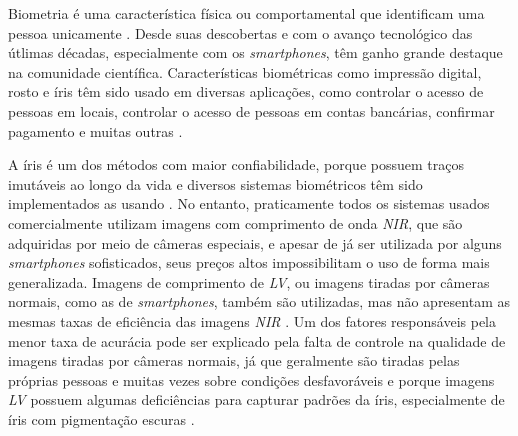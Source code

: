 
\par Biometria é uma característica física ou comportamental que identificam uma pessoa unicamente \cite{wayman2005biometric}. Desde suas descobertas e com o avanço tecnológico das útlimas décadas, especialmente com os \textit{smartphones}, têm ganho grande destaque na comunidade científica. Características biométricas como impressão digital, rosto e íris têm sido usado em diversas aplicações, como controlar o acesso de pessoas em locais, controlar o acesso de pessoas em contas bancárias, confirmar pagamento e muitas outras \cite{li2009encyclopedia, wayman2005biometric}.

\par A íris é um dos métodos com maior confiabilidade, porque possuem traços imutáveis ao longo da
vida e diversos sistemas biométricos têm sido implementados as usando \cite{daugman2004, wayman2005biometric, iris_segmentada,othman2015}. No entanto, praticamente todos os sistemas usados comercialmente utilizam imagens com comprimento de onda \textit{\acrfull{NIR}}, que são adquiridas por meio de câmeras
especiais, e apesar de já ser utilizada por alguns \textit{smartphones} sofisticados, seus preços altos impossibilitam o uso de forma mais generalizada. Imagens de comprimento de \textit{\acrfull{LV}}, ou imagens tiradas por câmeras normais, como as
de \textit{smartphones}, também são utilizadas, mas não apresentam as mesmas taxas de eficiência das
imagens \textit{\acrshort{NIR}} \cite{proenca2011,raja2014, raja2015, trokielwicz2016-Warsaw}. Um dos fatores responsáveis pela menor taxa de acurácia pode ser explicado pela falta de controle na qualidade de imagens tiradas por câmeras normais, já que geralmente são tiradas pelas próprias pessoas e muitas vezes sobre condições desfavoráveis e porque imagens \textit{\acrshort{LV}} possuem algumas deficiências para capturar padrões da íris, especialmente de íris com pigmentação escuras \cite{abdullah2015}. 


